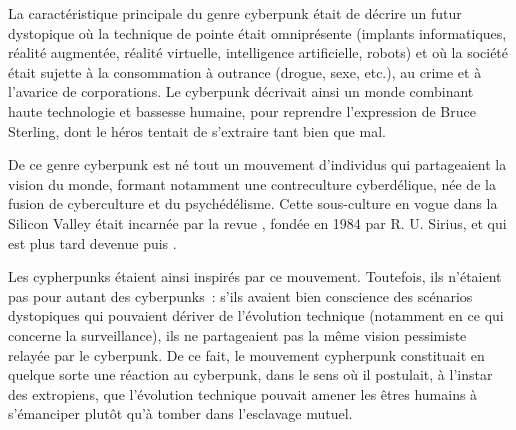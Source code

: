 La caractéristique principale du genre cyberpunk était de décrire un futur dystopique où la technique de pointe était omniprésente (implants informatiques, réalité augmentée, réalité virtuelle, intelligence artificielle, robots) et où la société était sujette à la consommation à outrance (drogue, sexe, etc.), au crime et à l'avarice de corporations. Le cyberpunk décrivait ainsi un monde combinant haute technologie et bassesse humaine, pour reprendre l'expression de Bruce Sterling, dont le héros tentait de s'extraire tant bien que mal. %

De ce genre cyberpunk est né tout un mouvement d'individus qui partageaient la vision du monde, formant notamment une contreculture cyberdélique, née de la fusion de cyberculture et du psychédélisme. Cette sous-culture en vogue dans la Silicon Valley était incarnée par la revue , fondée en 1984 par R. U. Sirius, et qui est plus tard devenue  puis .

Les cypherpunks étaient ainsi inspirés par ce mouvement. Toutefois, ils n'étaient pas pour autant des cyberpunks~: s'ils avaient bien conscience des scénarios dystopiques qui pouvaient dériver de l'évolution technique (notamment en ce qui concerne la surveillance), ils ne partageaient pas la même vision pessimiste relayée par le cyberpunk. De ce fait, le mouvement cypherpunk constituait en quelque sorte une réaction au cyberpunk, dans le sens où il postulait, à l'instar des extropiens, que l'évolution technique pouvait amener les êtres humains à s'émanciper plutôt qu'à tomber dans l'esclavage mutuel.

